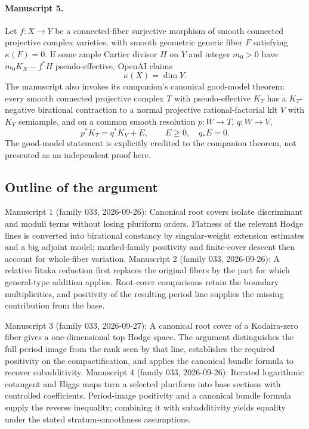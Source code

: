 \documentclass[11pt]{article}
\begin{document}
\paragraph{Manuscript 5.}
Let $f:X\to Y$ be a connected-fiber surjective morphism of smooth connected projective complex varieties, with smooth geometric generic fiber $F$ satisfying $\kappa(F)=0$. If some ample Cartier divisor $H$ on $Y$ and integer $m_0>0$ have $m_0K_X-f^*H$ pseudo-effective, OpenAI claims
\[
\kappa(X)=\dim Y.
\]
The manuscript also invokes its companion's canonical good-model theorem: every smooth connected projective complex $T$ with pseudo-effective $K_T$ has a $K_T$-negative birational contraction to a normal projective rational-factorial klt $V$ with $K_V$ semiample, and on a common smooth resolution $p:W\to T$, $q:W\to V$,
\[
p^*K_T=q^*K_V+E,\qquad E\ge0,\quad q_*E=0.
\]
The good-model statement is explicitly credited to the companion theorem, not presented as an independent proof here.

\subsection{Outline of the argument}
Manuscript 1 (family 033, 2026-09-26): Canonical root covers isolate discriminant and moduli terms without losing pluriform orders. Flatness of the relevant Hodge lines is converted into birational constancy by singular-weight extension estimates and a big adjoint model; marked-family positivity and finite-cover descent then account for whole-fiber variation. Manuscript 2 (family 033, 2026-09-26): A relative Iitaka reduction first replaces the original fibers by the part for which general-type addition applies. Root-cover comparisons retain the boundary multiplicities, and positivity of the resulting period line supplies the missing contribution from the base.

Manuscript 3 (family 033, 2026-09-27): A canonical root cover of a Kodaira-zero fiber gives a one-dimensional top Hodge space. The argument distinguishes the full period image from the rank seen by that line, establishes the required positivity on the compactification, and applies the canonical bundle formula to recover subadditivity. Manuscript 4 (family 033, 2026-09-26): Iterated logarithmic cotangent and Higgs maps turn a selected pluriform into base sections with controlled coefficients. Period-image positivity and a canonical bundle formula supply the reverse inequality; combining it with subadditivity yields equality under the stated stratum-smoothness assumptions.
\end{document}
